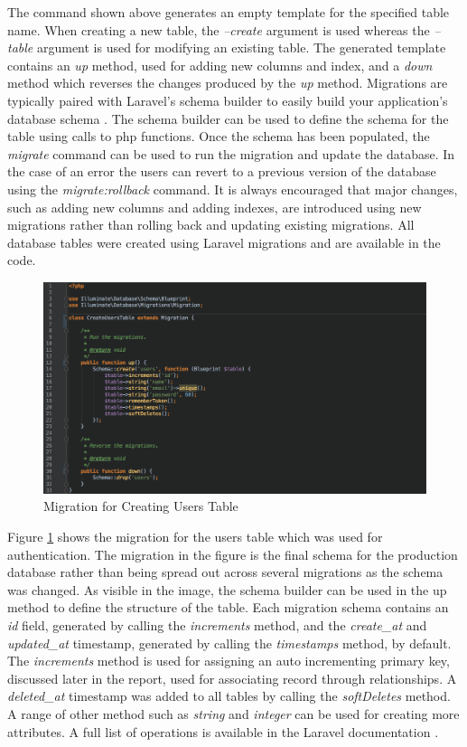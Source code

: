 The command shown above generates an empty template for the specified table name. When creating a new table, the \emph{--create} argument is used whereas the \emph{--table} argument is used for modifying an existing table. The generated template contains an \emph{up} method, used for adding new columns and index, and a \emph{down} method which reverses the changes produced by the \emph{up} method. Migrations are typically paired with Laravel's schema builder to easily build your application's database schema \cite{Laravel:Migrations}. The schema builder can be used to define the schema for the table using calls to php functions. Once the schema has been populated, the \emph{migrate} command can be used to run the migration and update the database. In the case of an error the users can revert to a previous version of the database using the \emph{migrate:rollback} command. It is always encouraged that major changes, such as adding new columns and adding indexes, are introduced using new migrations rather than rolling back and updating existing migrations. All database tables were created using Laravel migrations and are available in the code.

\begin{figure}[H]
	\centering
	\includegraphics[width=1.0\textwidth]{images/Code/Migration_Users}
	\caption{Migration for Creating Users Table} \label{fig:Migration_Users}
\end{figure}

Figure \ref{fig:Migration_Users} shows the migration for the users table which was used for authentication. The migration in the figure is the final schema for the production database rather than being spread out across several migrations as the schema was changed. As visible in the image, the schema builder can be used in the up method to define the structure of the table. Each migration schema contains an \emph{id} field, generated by calling the \emph{increments} method, and the \emph{create\_at} and \emph{updated\_at} timestamp, generated by calling the \emph{timestamps} method, by default. The \emph{increments} method is used for assigning an auto incrementing primary key, discussed later in the report, used for associating record through relationships. A \emph{deleted\_at} timestamp was added to all tables by calling the \emph{softDeletes} method. A range of other method such as \emph{string} and \emph{integer} can be used for creating more attributes. A full list of operations is available in the Laravel documentation \cite{Laravel:Migrations}. 

